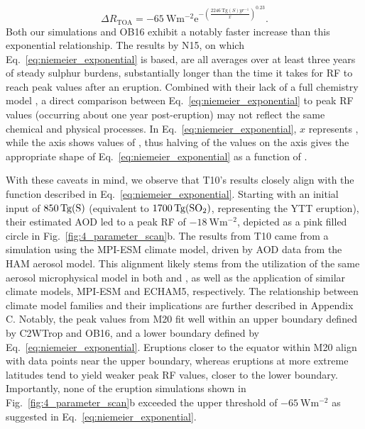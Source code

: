 \documentclass[draft]{agujournal2019}
\begin{document}
\begin{equation}
  \Delta
  R_{\mathrm{TOA}} =
  -\SI{65}{\watt\metre^{-2}}
  \mathrm{e}^{-{\left(\frac{\SI{2246}{\tera\gram(S)yr^{-1}}}{x}\right)}^{0.23}}.
  \label{eq:niemeier_exponential}
\end{equation}
%
Both our simulations and OB16 exhibit a notably faster increase than this exponential
relationship. The results by N15, on which Eq.~\ref{eq:niemeier_exponential} is based,
are all averages over at least three years of steady sulphur burdens, substantially
longer than the time it takes for RF to reach peak values after an eruption. Combined
with their lack of a full chemistry model \cite{niemeier2015}, a direct comparison
between Eq.~\ref{eq:niemeier_exponential} to peak RF values (occurring about one year
post-eruption) may not reflect the same chemical and physical processes. In
Eq.~\ref{eq:niemeier_exponential}, \(x\) represents , while the axis shows values
of , thus halving of the  values on the axis gives the appropriate shape
of Eq.~\ref{eq:niemeier_exponential} as a function of .

With these caveats in mind, we observe that T10's results closely align with the
function described in Eq.~\ref{eq:niemeier_exponential}. Starting with an initial input
of \(\SI{850}{\tera\gram(\ce{S})}\) (equivalent to \(\SI{1700}{\tera\gram(\ce{SO2})}\),
representing the YTT eruption), their estimated AOD led to a peak RF of
\(\SI{-18}{\watt\meter^{-2}}\), depicted as a pink filled circle in
Fig.~\ref{fig:4_parameter_scan}b. The results from T10 came from a simulation using the
MPI-ESM climate model, driven by AOD data from the HAM aerosol model. This alignment
likely stems from the utilization of the same aerosol microphysical model in both
 and , as well as the application of similar
climate models, MPI-ESM and ECHAM5, respectively. The relationship between climate model
families and their implications are further described in Appendix C. Notably, the peak
values from M20 fit well within an upper boundary defined by C2WTrop and OB16, and a
lower boundary defined by Eq.~\ref{eq:niemeier_exponential}. Eruptions closer to the
equator within M20 align with data points near the upper boundary, whereas eruptions at
more extreme latitudes tend to yield weaker peak RF values, closer to the lower
boundary. Importantly, none of the eruption simulations shown in
Fig.~\ref{fig:4_parameter_scan}b exceeded the upper threshold of
\(\SI{-65}{\watt\meter^{-2}}\) as suggested in Eq.~\ref{eq:niemeier_exponential}.
\end{document}
